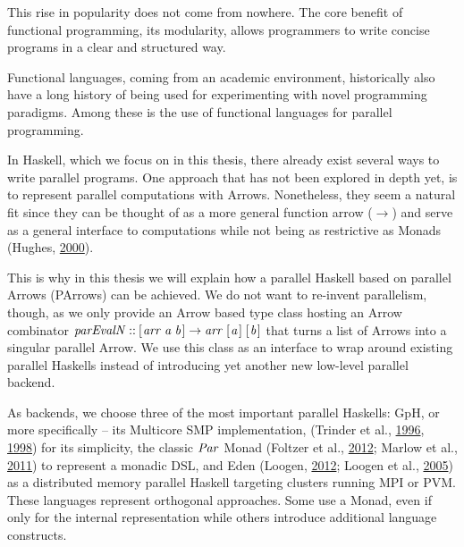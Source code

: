 \documentclass[paper=A4,twoside=true,openright,parskip=full,chapterprefix=true,headings=normal,bibliography=totoc,listof=totoc,titlepage=on,captions=tableabove,draft=false,british]{scrreprt}%
\begin{document}
This rise in popularity does not come from nowhere. The core benefit of
functional programming, its modularity, allows programmers to write
concise programs in a clear and structured way.

Functional languages, coming from an academic environment, historically
also have a long history of being used for experimenting with novel
programming paradigms. Among these is the use of functional languages
for parallel programming.

In Haskell, which we focus on in this thesis, there already exist
several ways to write parallel programs. One approach that has not been
explored in depth yet, is to represent parallel computations with
Arrows. Nonetheless, they seem a natural fit since they can be thought
of as a more general function arrow (\ensuremath{\to }) and serve as a general
interface to computations while not being as restrictive as Monads
(Hughes, \protect\hyperlink{ref-HughesArrows}{2000}).

This is why in this thesis we will explain how a parallel Haskell based
on parallel Arrows (PArrows) can be achieved. We do not want to
re-invent parallelism, though, as we only provide an Arrow based type
class hosting an Arrow combinator \ensuremath{\Varid{parEvalN}\mathbin{::}[\mskip1.5mu \Varid{arr}\;\Varid{a}\;\Varid{b}\mskip1.5mu]\to \Varid{arr}\;[\mskip1.5mu \Varid{a}\mskip1.5mu]\;[\mskip1.5mu \Varid{b}\mskip1.5mu]}
that turns a list of Arrows into a singular parallel Arrow. We use this
class as an interface to wrap around existing parallel Haskells instead
of introducing yet another new low-level parallel backend.

As backends, we choose three of the most important parallel Haskells:
GpH, or more specifically -- its Multicore SMP implementation, (Trinder
et al., \protect\hyperlink{ref-Trinder1996}{1996},
\protect\hyperlink{ref-Trinder1998a}{1998}) for its simplicity, the
classic \ensuremath{\Conid{Par}} Monad (Foltzer et al.,
\protect\hyperlink{ref-Foltzer:2012:MPC:2398856.2364562}{2012}; Marlow
et al., \protect\hyperlink{ref-par-monad}{2011}) to represent a monadic
DSL, and Eden (Loogen, \protect\hyperlink{ref-Loogen2012}{2012}; Loogen
et al., \protect\hyperlink{ref-eden}{2005}) as a distributed memory
parallel Haskell targeting clusters running MPI or PVM. These languages
represent orthogonal approaches. Some use a Monad, even if only for the
internal representation while others introduce additional language
constructs.
\end{document}
